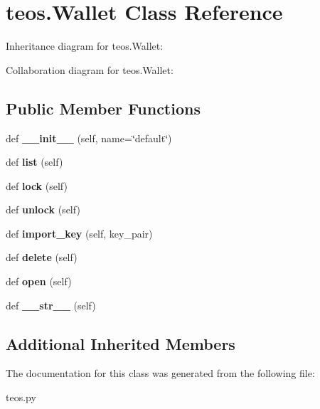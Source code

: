\hypertarget{classteos_1_1Wallet}{}\section{teos.\+Wallet Class Reference}
\label{classteos_1_1Wallet}


Inheritance diagram for teos.\+Wallet\+:


Collaboration diagram for teos.\+Wallet\+:
\subsection*{Public Member Functions}
\begin{DoxyCompactItemize}
\item 
\mbox{\label{classteos_1_1Wallet_a4eaefa12986935e9498768db191751a1}} 
def {\bfseries \+\_\+\+\_\+init\+\_\+\+\_\+} (self, name=\char`\"{}default\char`\"{})
\item 
\mbox{\label{classteos_1_1Wallet_a88b169029307c74cd4b17d3079d493c8}} 
def {\bfseries list} (self)
\item 
\mbox{\label{classteos_1_1Wallet_a198acbf84830a6303cf36c165558661e}} 
def {\bfseries lock} (self)
\item 
\mbox{\label{classteos_1_1Wallet_a12edeadb36a4ed97b21090d488bf6af2}} 
def {\bfseries unlock} (self)
\item 
\mbox{\label{classteos_1_1Wallet_abf5c63c6a5c10fbfa37456ce3c46de51}} 
def {\bfseries import\+\_\+key} (self, key\+\_\+pair)
\item 
\mbox{\label{classteos_1_1Wallet_a2e5c62fe9273dfec907592a20e2567d3}} 
def {\bfseries delete} (self)
\item 
\mbox{\label{classteos_1_1Wallet_a9e4a31d520fd8283ce96ad9de88bed50}} 
def {\bfseries open} (self)
\item 
\mbox{\label{classteos_1_1Wallet_a9f11ae409175fcbe402317bed6c32c0e}} 
def {\bfseries \+\_\+\+\_\+str\+\_\+\+\_\+} (self)
\end{DoxyCompactItemize}
\subsection*{Additional Inherited Members}


The documentation for this class was generated from the following file\+:\begin{DoxyCompactItemize}
\item 
teos.\+py\end{DoxyCompactItemize}
